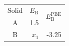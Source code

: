 \documentclass{article}
\begin{document}
\begin{tabular}{c d{1} d{1}}
Solid &  &  \\
A & 1.5 & $2.5$ \\
B & \mbox{$x_1$} & -3.25
\end{tabular}
\end{document}
